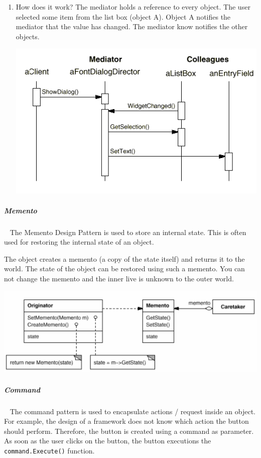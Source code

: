 \documentclass[11pt,twoside,landscape]{article}
\begin{document}
\begin{multicols}{3}
\begin{enumerate}
\item How does it work?
\label{sec:org53740e4}
The mediator holds a reference to every object.
The user selected some item from the list box (object A).
Object A notifies the mediator that the value has changed.
The mediator know notifies the other objects.

{
\begin{center}
\includegraphics[width=.9\linewidth]{img/mediator_sequence_diagram.png}
\end{center}
\label{fig:mediator-sequence-diagram}
}
\end{enumerate}

\subparagraph{Memento} \
\label{sec:org06b5bcc}
The Memento Design Pattern is used to store an internal state.
This is often used for restoring the internal state of an object.

The object creates a memento (a copy of the state itself) and returns it to the world.
The state of the object can be restored using such a memento.
You can not change the memento and the inner live is unknown to the outer world.


{
\begin{center}
\includegraphics[width=.9\linewidth]{img/memento.png}
\end{center}
\label{fig:memento-class-diagram}
}
\subparagraph{Command} \
\label{sec:org0c514e5}
The command pattern is used to encapsulate actions / request inside an object.
For example, the design of a framework does not know which action the button should perform.
Therefore, the button is created using a command as parameter.
As soon as the user clicks on the button, the button executions the \texttt{command.Execute()} function.


\end{multicols}
\end{document}

